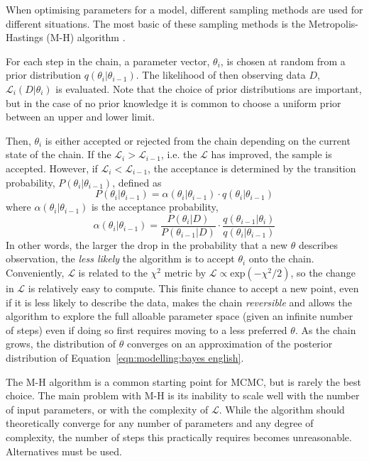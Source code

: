 When optimising parameters for a model, different sampling methods are used for different situations.
The most basic of these sampling methods is the Metropolis-Hastings (M-H) algorithm \citep{metropolis1953,hastings1970}.

For each step in the chain, a parameter vector, $\theta_i$, is chosen at random from a prior distribution $q(\theta_i | \theta_{i-1})$. The likelihood of then observing data $D$, $\mathcal{L}_i(D | \theta_i)$ is evaluated. Note that the choice of prior distributions are important, but in the case of no prior knowledge it is common to choose a uniform prior between an upper and lower limit.

Then, $\theta_i$ is either accepted or rejected from the chain depending on the current state of the chain. If the $\mathcal{L}_i > \mathcal{L}_{i-1}$, i.e. the $\mathcal{L}$ has improved, the sample is accepted. However, if $\mathcal{L}_i < \mathcal{L}_{i-1}$, the acceptance is determined by the transition probability, $P(\theta_i | \theta_{i-1})$, defined as
\begin{equation}
    P(\theta_i | \theta_{i-1}) = \alpha(\theta_i | \theta_{i-1}) \cdot q(\theta_i | \theta_{i-1})
\end{equation}
where $\alpha(\theta_i | \theta_{i-1})$ is the acceptance probability,
\begin{equation}
    \alpha(\theta_i | \theta_{i-1}) = \frac{P(\theta_i | D)} {P(\theta_{i-1} | D)} \cdot \frac{q(\theta_{i-1} | \theta_i)} {q (\theta_i | \theta_{i-1})}
\end{equation}
In other words, the larger the drop in the probability that a new $\theta$ describes observation, the \textit{less likely} the algorithm is to accept $\theta_i$ onto the chain.
Conveniently, $\mathcal{L}$ is related to the $\chi^2$ metric by $\mathcal{L} \propto \mathrm{exp}(-\chi^2/2)$, so the change in $\mathcal{L}$ is relatively easy to compute.
This finite chance to accept a new point, even if it is less likely to describe the data, makes the chain \textit{reversible} and allows the algorithm to explore the full alloable parameter space (given an infinite number of steps) even if doing so first requires moving to a less preferred $\theta$. As the chain grows, the distribution of $\theta$ converges on an approximation of the posterior distribution of Equation~\ref{eqn:modelling:bayes english}.

The M-H algorithm is a common starting point for MCMC, but is rarely the best choice. The main problem with M-H is its inability to scale well with the number of input parameters, or with the complexity of $\mathcal{L}$. While the algorithm should theoretically converge for any number of parameters and any degree of complexity, the number of steps this practically requires becomes unreasonable. Alternatives must be used.


